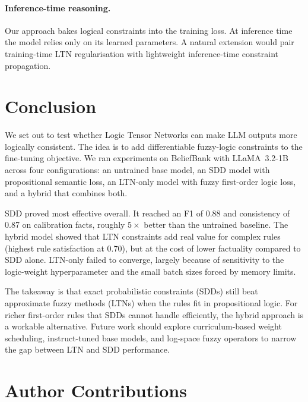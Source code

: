 \documentclass[11pt,a4paper]{article}
\begin{document}
\paragraph{Inference-time reasoning.}
Our approach bakes logical constraints into the training loss.  At
inference time the model relies only on its learned parameters.  A
natural extension would pair training-time LTN regularisation with
lightweight inference-time constraint propagation.

\section{Conclusion}

We set out to test whether Logic Tensor Networks can make LLM outputs
more logically consistent.  The idea is to add differentiable fuzzy-logic
constraints to the fine-tuning objective.  We ran experiments on
BeliefBank with LLaMA~3.2-1B across four configurations: an untrained
base model, an SDD model with propositional semantic loss, an LTN-only
model with fuzzy first-order logic loss, and a hybrid that combines both.

SDD proved most effective overall.  It reached an F1 of 0.88 and
consistency of 0.87 on calibration facts, roughly $5\times$ better than
the untrained baseline.  The hybrid model showed that LTN constraints add
real value for complex rules (highest rule satisfaction at 0.70), but at
the cost of lower factuality compared to SDD alone.  LTN-only failed to
converge, largely because of sensitivity to the logic-weight
hyperparameter and the small batch sizes forced by memory limits.

The takeaway is that exact probabilistic constraints (SDDs) still
beat approximate fuzzy methods (LTNs) when the rules fit in
propositional logic.  For richer first-order rules that SDDs cannot
handle efficiently, the hybrid approach is a workable alternative.
Future work should explore curriculum-based weight scheduling,
instruct-tuned base models, and log-space fuzzy operators to narrow
the gap between LTN and SDD performance.

\section{Author Contributions}
\end{document}
